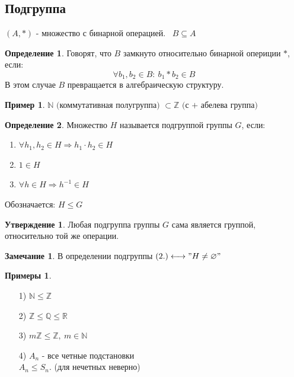 \documentclass[a4paper, 12pt]{article}
\newcommand{\R}{\mathbb R}
\newcommand{\Q}{\mathbb Q}
\newcommand{\Z}{\mathbb Z}
\newcommand{\N}{\mathbb N}
\newcommand\tab[1][.5cm]{\hspace*{#1}}
\theoremstyle{definition}
\newtheorem*{definition}{Определение}
\newtheorem*{subtheorem}{Утверждение}
\newtheorem*{remark}{Замечание}
\newtheorem*{example}{Примеры}
\newtheorem*{example1}{Пример}
\begin{document}
  \subsection{Подгруппа}
  $(A,*)$ - множество с бинарной операцией. \ $B \subseteq A$ 
  \begin{definition}
    Говорят, что $B$ замкнуто относительно бинарной опериции $*$, если: $$\forall b_1,b_2 \in B: \ b_1 * b_2 \in B$$
    В этом случае $B$ превращается в алгебраическую структуру.   
  \end{definition}  
  \begin{example1}
    $\N \text{ (коммутативная полугруппа) }  \subset \Z \text{ (с + абелева группа) }$ 
  \end{example1}
  \begin{definition}
    Множество $H$ называется подгруппой группы $G$, если:
    \begin{enumerate}
      \item $\forall h_1,h_2 \in H \Longrightarrow h_1 \cdot h_2 \in H$ 
      \item $1 \in H$
      \item $\forall h \in H \Longrightarrow h^{-1} \in H$  
    \end{enumerate}
    Обозначается: $H\leq G$ 
  \end{definition} 
  \begin{subtheorem}
    Любая подгруппа группы $G$ сама является группой, относительно той же операции.
  \end{subtheorem} 
  \begin{remark}
    В определении подгруппы $(2.) \longleftrightarrow "H \neq \varnothing"$ 
  \end{remark} 
  \begin{example}\tab
    \begin{itemize}
      \item[1)] $\N\leq \Z$
      \item[2)] $\Z \leq \Q \leq \R$
      \item[3)] $m\Z \leq\Z, \ m\in \N$   
      \item[4)] $A_n$ - все четные подстановки\\
      $A_n \leq S_n$. (для нечетных неверно)    
    \end{itemize}
  \end{example}
\end{document}
